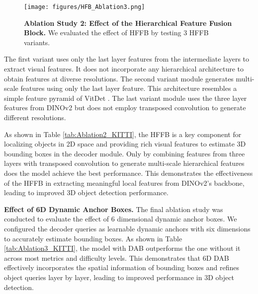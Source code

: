 \begin{figure}[h]
    \centering
    \texttt{[image: figures/HFB\_Ablation3.png]}
    \caption[Ablation Study 2: Effect of the HFFB]{\textbf{Ablation Study 2: Effect of the Hierarchical Feature Fusion Block.} We evaluated the effect of HFFB by testing 3 HFFB variants.
    } \label{fig:HFB Ablation}
\end{figure}

The first variant uses only the last layer features from the intermediate layers to extract visual features. It does not incorporate any hierarchical architecture to obtain features at diverse resolutions.
The second variant module generates multi-scale features using only the last layer feature.
This architecture resembles a simple feature pyramid of VitDet \cite{li2022exploring}.
The last variant module uses the three layer features from DINOv2 but does not employ transposed convolution to generate different resolutions.

As shown in Table \ref{tab:Ablation2_KITTI}, the HFFB is a key component for localizing objects in 2D space and providing rich visual features to estimate 3D bounding boxes in the decoder module.
Only by combining features from three layers with transposed convolution to generate multi-scale hierarchical features does the model achieve the best performance.
This demonstrates the effectiveness of the HFFB in extracting meaningful local features from DINOv2’s backbone, leading to improved 3D object detection performance.

\textbf{Effect of 6D Dynamic Anchor Boxes.} The final ablation study was conducted to evaluate the effect of 6 dimensional dynamic anchor boxes. We configured the decoder queries as learnable dynamic anchors with six dimensions to accurately estimate bounding boxes. As shown in Table \ref{tab:Ablation3_KITTI}, the model with DAB outperforms the one without it across most metrics and difficulty levels. This demonstrates that 6D DAB effectively incorporates the spatial information of bounding boxes and refines object queries layer by layer, leading to improved performance in 3D object detection.

